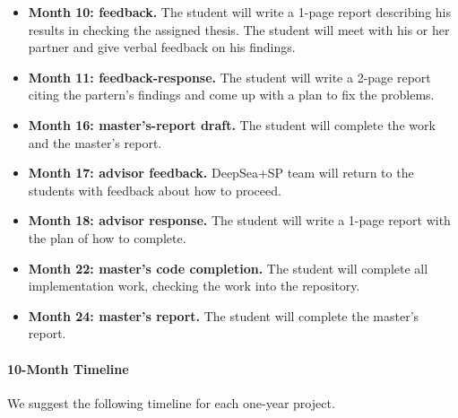 \documentclass[11pt]{article}
\begin{document}
\begin{itemize}
\item {\bf Month 10: feedback.}  The student will write a
  1-page report describing his results in checking the assigned
  thesis.  The student will meet with his or her partner and give
  verbal feedback on his findings.

\item {\bf Month 11: feedback-response.}  The student will
  write a 2-page report citing the partern's findings and come up with
  a plan to fix the problems.

\item {\bf Month 16: master's-report draft.}  The student will complete the
  work and the master's report.

\item {\bf Month 17: advisor feedback.}  DeepSea+SP team will return to
  the students with feedback about how to proceed.

\item {\bf Month 18: advisor response.} The student will write a
  1-page report with the plan of how to complete.

\item {\bf Month 22: master's code completion.} The student will
  complete all implementation work, checking the work into the
  repository.

\item {\bf Month 24: master's report.} The student will complete the
  master's report.
\end{itemize}


\paragraph{10-Month Timeline}
We suggest the following timeline for each one-year project.
\end{document}
